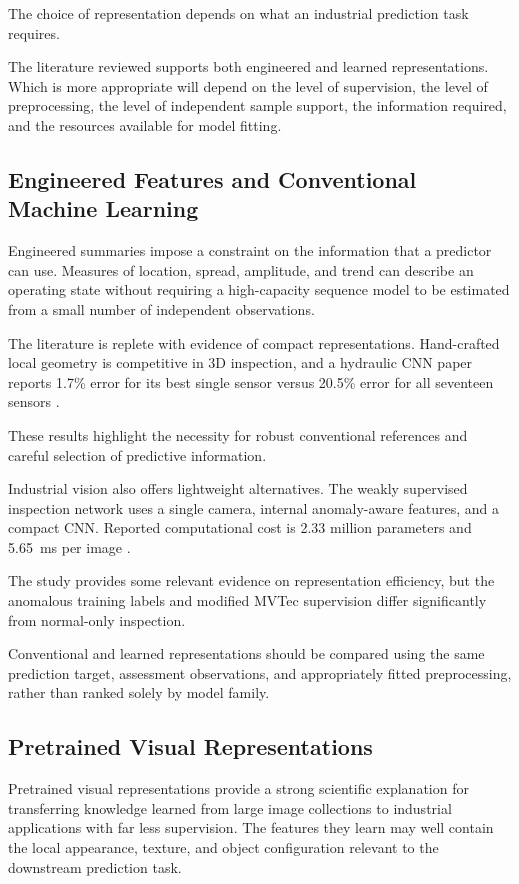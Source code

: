 The choice of representation depends on what an industrial prediction task requires.

The literature reviewed supports both engineered and learned representations. Which is more
appropriate will depend on the level of supervision, the level of preprocessing, the level of
independent sample support, the information required, and the resources available for model fitting.

\subsection{Engineered Features and Conventional Machine Learning}

Engineered summaries impose a constraint on the information that a predictor can use. Measures of
location, spread, amplitude, and trend can describe an operating state without requiring a
high-capacity sequence model to be estimated from a small number of independent observations.

The literature is replete with evidence of compact representations. Hand-crafted local geometry is
competitive in 3D inspection, and a hydraulic CNN paper reports 1.7\% error for its best single
sensor versus 20.5\% error for all seventeen sensors \parencite{horwitz_back_2023,goodarzi_deep_2023}.

These results highlight the necessity for robust conventional references and careful selection of
predictive information.

Industrial vision also offers lightweight alternatives. The weakly supervised inspection network
uses a single camera, internal anomaly-aware features, and a compact CNN. Reported computational
cost is 2.33 million parameters and 5.65~ms per image \parencite[Table~V]{zhang_combined_2024}.

The study provides some relevant evidence on representation efficiency, but the anomalous training
labels and modified MVTec supervision differ significantly from normal-only inspection.

Conventional and learned representations should be compared using the same prediction target,
assessment observations, and appropriately fitted preprocessing, rather than ranked solely by model
family.

\subsection{Pretrained Visual Representations}

Pretrained visual representations provide a strong scientific explanation for transferring knowledge
learned from large image collections to industrial applications with far less supervision. The
features they learn may well contain the local appearance, texture, and object configuration
relevant to the downstream prediction task.


